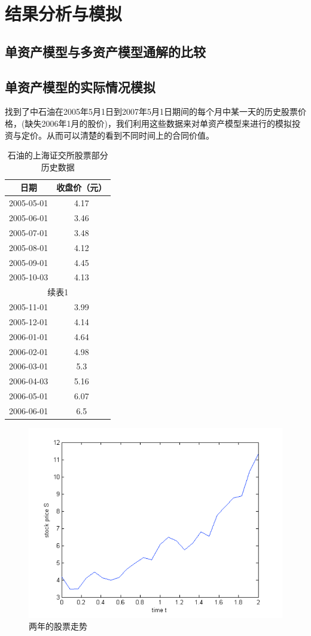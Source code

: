 \chapter{结果分析与模拟}
\section{单资产模型与多资产模型通解的比较}
\section{单资产模型的实际情况模拟}
找到了中石油在2005年5月1日到2007年5月1日期间的每个月中某一天的历史股票价格，(缺失2006年1月的股价)，我们利用这些数据来对单资产模型来进行的模拟投资与定价。从而可以清楚的看到不同时间上的合同价值。
\begin{table}[htbp]
	\caption{石油的上海证交所股票部分历史数据}
	\centering
	\begin{tabular}{c c}
	\hline
	日期       &       收盘价（元）\\
	\hline
	2005-05-01& 	   4.17      \\
	2005-06-01& 	   3.46      \\
	2005-07-01& 	   3.48      \\
	2005-08-01& 	   4.12      \\
	2005-09-01& 	   4.45      \\
	2005-10-03& 	   4.13      \\
	\multicolumn{2}{c}{续表1}     \\
	2005-11-01&        3.99       \\
	2005-12-01&        4.14       \\
	2006-01-01&        4.64       \\
	2006-02-01&        4.98       \\
	2006-03-01&        5.3       \\
	2006-04-03&        5.16       \\
	2006-05-01&        6.07       \\
	2006-06-01&        6.5       \\
	\end{tabular}
\end{table}
\begin{figure}
	\centering
	\includegraphics[totalheight=6cm]{pic/tu1}
	\caption{两年的股票走势}
\end{figure}

